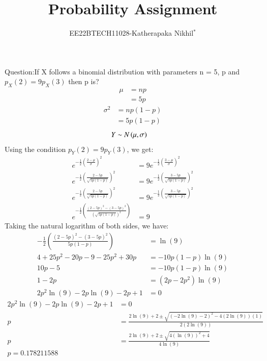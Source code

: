 \documentclass[journal,12pt,twocolumn]{IEEEtran}
\theoremstyle{remark}
\begin{document}

\vspace{3cm}

\title{Probability Assignment}
\author{EE22BTECH11028-Katherapaka Nikhil$^{*}$%
}
\maketitle
\newpage
\bigskip
\renewcommand{\thefigure}{\theenumi}
\renewcommand{\thetable}{\theenumi}

Question:If X follows a binomial distribution with parameters n = 5, p and
$p_X(2) = 9p_X(3)$
then p is?\\
\fi
\solution
\begin{align}
\mu&=np\\
&=5p
\end{align}
\begin{align}
\sigma^2&=np(1-p)\\
&=5p(1-p)
\end{align}
\begin{align}
	Y &\sim N\left(\mu,\sigma\right)
\end{align}
Using the condition \(p_Y(2) = 9p_Y(3)\), we get:
\begin{align}
e^{-\frac{1}{2}(\frac{2-\mu}{\sigma})^2} &= 9 e^{-\frac{1}{2}\left(\frac{3-\mu}{\sigma}\right)^2} \\
e^{-\frac{1}{2}\left(\frac{2 -  5p}{\sqrt{5p(1-p)}}\right)^2} &= 9 e^{-\frac{1}{2}\left(\frac{3 - 5p}{\sqrt{5p(1-p)}}\right)^2} \\
e^{-\frac{1}{2}\left(\frac{2 - 5p}{\sqrt{5p(1-p)}}\right)^2} &= 9 e^{-\frac{1}{2}\left(\frac{3 - 5p}{\sqrt{5p(1-p)}}\right)^2} \\
e^{-\frac{1}{2}\left(\frac{(2 - 5p)^2-(3 - 5p)^2}{(\sqrt{5p(1-p)})^2}\right)}&=9
\end{align}
Taking the natural logarithm of both sides, we have:
\begin{align}
-\frac{1}{2}\left(\frac{(2 - 5p)^2-(3 - 5p)^2}{5p(1-p)}\right) &= \ln(9) \\
4+25p^2-20p-9-25p^2+30p &= -10p(1-p) \ln(9) \\
10p-5 &= -10p(1-p) \ln(9) \\
1-2p &= (2p-2p^2) \ln(9) \\
2p^2\ln(9) - 2p\ln(9) - 2p + 1 &= 0 
\end{align}
\begin{align}
2p^2\ln(9) - 2p\ln(9) - 2p + 1 &= 0 \\
p &= \frac{2\ln(9) + 2 \pm \sqrt{(-2\ln(9) - 2)^2 - 4(2\ln(9))(1)}}{2(2\ln(9))} \\
p &= \frac{2\ln(9) + 2 \pm \sqrt{4(\ln(9))^2 +4}}{4\ln(9)}\\
p=0.178211588
\end{align}
\end{document}
